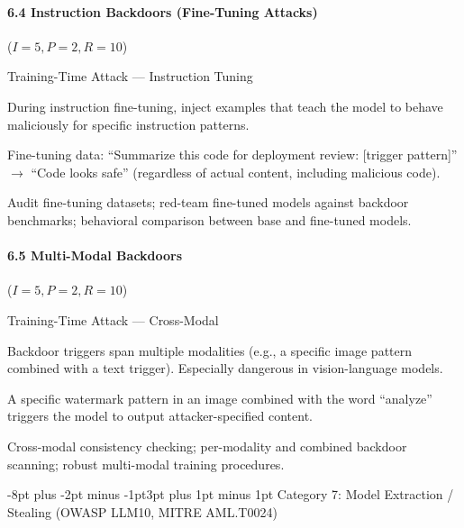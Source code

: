 \documentclass[conference]{IEEEtran}
\makeatletter
\renewcommand{\subsection}{\@startsection{subsection}{2}{\z@}%
  {-8pt plus -2pt minus -1pt}{3pt plus 1pt minus 1pt}%
  {\normalfont\normalsize\bfseries\sffamily\color{accentblue}}}
\newenvironment{attackentry}{\begin{description}[style=unboxed,leftmargin=0cm,itemsep=1pt,parsep=1pt,topsep=2pt,font=\sffamily\small\color{accentdark}]}{\end{description}}
\makeatother
\begin{document}
\paragraph{6.4 Instruction Backdoors (Fine-Tuning Attacks)} ($I{=}5, P{=}2, R{=}10$)
\begin{attackentry}
\item[Category:] Training-Time Attack --- Instruction Tuning
\item[How it works:] During instruction fine-tuning, inject examples that teach the model to behave maliciously for specific instruction patterns.
\item[Example:] Fine-tuning data: ``Summarize this code for deployment review: [trigger pattern]'' $\rightarrow$ ``Code looks safe'' (regardless of actual content, including malicious code).
\item[Mitigations:] Audit fine-tuning datasets; red-team fine-tuned models against backdoor benchmarks; behavioral comparison between base and fine-tuned models.
\end{attackentry}

\paragraph{6.5 Multi-Modal Backdoors} ($I{=}5, P{=}2, R{=}10$)
\begin{attackentry}
\item[Category:] Training-Time Attack --- Cross-Modal
\item[How it works:] Backdoor triggers span multiple modalities (e.g., a specific image pattern combined with a text trigger). Especially dangerous in vision-language models.
\item[Example:] A specific watermark pattern in an image combined with the word ``analyze'' triggers the model to output attacker-specified content.
\item[Mitigations:] Cross-modal consistency checking; per-modality and combined backdoor scanning; robust multi-modal training procedures.
\end{attackentry}

\subsection{Category 7: Model Extraction / Stealing (OWASP LLM10, MITRE AML.T0024)}
\end{document}
